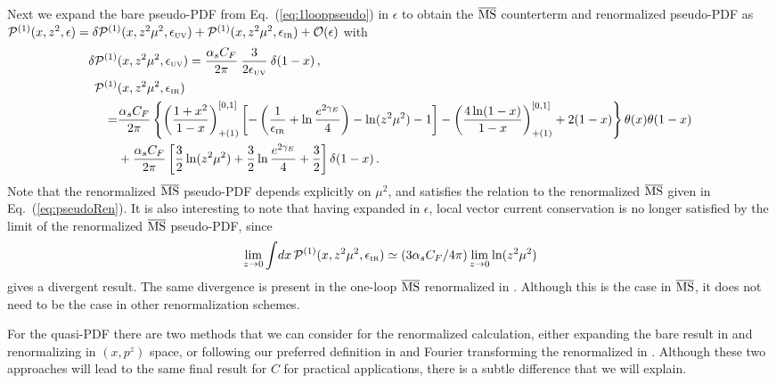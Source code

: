 \begin{widetext}
Next we expand the bare pseudo-PDF from Eq.~(\ref{eq:1looppseudo}) in $\epsilon$ to obtain the $\overline{\rm MS}$ counterterm and renormalized pseudo-PDF as ${\cal P}^{(1)} (x,z^2,\epsilon)= \delta {\cal P}^{(1)} (x,z^2\mu^2,\epsilon_{\mbox{\tiny UV}})+{\cal P}^{(1)} (x,z^2\mu^2,\epsilon_{\mbox{\tiny IR}})+{\cal O}(\epsilon)$ with
\begin{align}\label{eq:1looppseudopdfb}
\delta {\cal P}^{(1)} &(x,z^2\mu^2,\epsilon_{\mbox{\tiny UV}})
	= {\alpha_sC_F\over 2\pi}\:
    {3\over 2\epsilon_{\mbox{\tiny UV}}} \: \delta(1-x)
  \,, \\
{\cal P}^{(1)} &(x,z^2\mu^2,\epsilon_{\mbox{\tiny IR}})
\nonumber\\
	=&{\alpha_sC_F\over 2\pi}\left\{\left({1+x^2\over 1-x}\right)^{[0,1]}_{+(1)}\left[- \left({1\over \epsilon_{\mbox{\tiny IR}}}+\ln{e^{2\gamma_E}\over 4}\right)-\ln(z^2 \mu^2)-1\right] - \left(4\ln(1-x)\over 1-x\right)^{[0,1]}_{+(1)}  +2(1-x)\right\}\theta(x)\theta(1-x)\nonumber\\
	&  +{\alpha_sC_F\over 2\pi}\left[{3\over2}\ln(z^2\mu^2) + {3\over2}\ln{e^{2\gamma_E}\over 4}+{3\over2}\right]\delta(1-x)
 \,.\nonumber
\end{align}
Note that the renormalized $\overline{\rm MS}$ pseudo-PDF depends explicitly on $\mu^2$, and satisfies the relation to the renormalized $\overline{\rm MS}$ \spcorr given in Eq.~(\ref{eq:pseudoRen}).
It is also interesting to note that having expanded in $\epsilon$, local vector current conservation is no longer satisfied by the limit of the renormalized $\overline{\rm MS}$ pseudo-PDF, since
\begin{align} \label{eq:Ppdfconsrv}
\lim_{z\to 0} \int\! dx \, {\cal P}^{(1)} (x,z^2\mu^2,\epsilon_{\mbox{\tiny IR}}) \simeq (3\alpha_s C_F/4\pi) \lim_{z\to 0} \ln(z^2\mu^2)
\end{align}
gives a divergent result. The same divergence is present in the one-loop $\overline{\rm MS}$ renormalized \spcorr in .  Although this is the case in $\overline{\rm MS}$, it does not need to be the case in other renormalization schemes.

For the quasi-PDF there are two methods that we can consider for the renormalized calculation, either expanding the bare result in  and renormalizing in $(x,p^z)$ space, or following our preferred definition in  and Fourier transforming the renormalized \spcorr in .  Although these two approaches will lead to the same final result for $C$ for practical applications, there is a subtle difference that we will explain.


\end{widetext}
